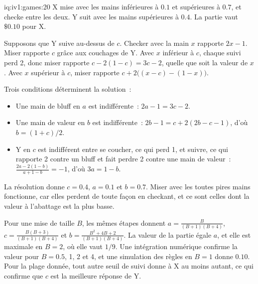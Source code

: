 \begin{solution}{iq:iv1:games:20}
X mise avec les mains inférieures à $0.1$ et supérieures à $0.7$, et checke entre les deux. Y suit avec les mains supérieures à $0.4$. La partie vaut $\$0.10$ pour X.

Supposons que Y suive au-dessus de $c$. Checker avec la main $x$ rapporte $2x - 1$. Miser rapporte $c$ grâce aux couchages de Y. Avec $x$ inférieur à $c$, chaque suivi perd 2, donc miser rapporte $c - 2(1 - c) = 3c - 2$, quelle que soit la valeur de $x$. Avec $x$ supérieur à $c$, miser rapporte $c + 2\bigl((x - c) - (1 - x)\bigr)$.

Trois conditions déterminent la solution~:
\begin{itemize}
\item Une main de bluff en $a$ est indifférente~: $2a - 1 = 3c - 2$.
\item Une main de valeur en $b$ est indifférente~: $2b - 1 = c + 2(2b - c - 1)$, d'où $b = (1 + c)/2$.
\item Y en $c$ est indifférent entre se coucher, ce qui perd 1, et suivre, ce qui rapporte 2 contre un bluff et fait perdre 2 contre une main de valeur~: $\frac{2a - 2(1 - b)}{a + 1 - b} = -1$, d'où $3a = 1 - b$.
\end{itemize}
La résolution donne $c = 0.4$, $a = 0.1$ et $b = 0.7$. Miser avec les toutes pires mains fonctionne, car elles perdent de toute façon en checkant, et ce sont celles dont la valeur à l'abattage est la plus basse.

Pour une mise de taille $B$, les mêmes étapes donnent $a = \frac{B}{(B + 1)(B + 4)}$, $c = \frac{B(B + 3)}{(B + 1)(B + 4)}$ et $b = \frac{B^2 + 4B + 2}{(B + 1)(B + 4)}$. La valeur de la partie égale $a$, et elle est maximale en $B = 2$, où elle vaut $1/9$. Une intégration numérique confirme la valeur pour $B = 0.5$, 1, 2 et 4, et une simulation des règles en $B = 1$ donne $0.10$. Pour la plage donnée, tout autre seuil de suivi donne à X au moins autant, ce qui confirme que $c$ est la meilleure réponse de Y.

\end{solution}
